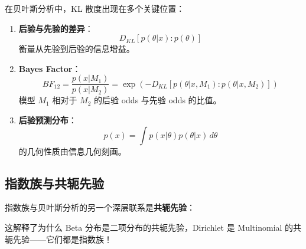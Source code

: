 在贝叶斯分析中，KL 散度出现在多个关键位置：

\begin{enumerate}
    \item \textbf{后验与先验的差异}：
    \begin{equation}
        D_{KL}[p(\theta|x) : p(\theta)]
    \end{equation}
    衡量从先验到后验的信息增益。

    \item \textbf{Bayes Factor}：
    \begin{equation}
        BF_{12} = \frac{p(x|M_1)}{p(x|M_2)} = \exp\left(-D_{KL}[p(\theta|x,M_1) : p(\theta|x,M_2)]\right)
    \end{equation}
    模型 $M_1$ 相对于 $M_2$ 的后验 odds 与先验 odds 的比值。

    \item \textbf{后验预测分布}：
    \begin{equation}
        p(x) = \int p(x|\theta) p(\theta|x) \, d\theta
    \end{equation}
    的几何性质由信息几何刻画。
\end{enumerate}


\subsection{指数族与共轭先验}\label{sec:exp-fam-conjugate}

指数族与贝叶斯分析的另一个深层联系是\textbf{共轭先验}：

\begin{Theorem}[指数族的共轭性]\label_thm:conjugate-prior}
    若似然函数来自指数族：
    \begin{equation}
        p(x|\theta) = \exp(\theta \cdot u(x) - \psi(\theta))
    \end{equation}
    则共轭先验具有形式：
    \begin{equation}
        p(\theta|\alpha, \beta) \propto \exp(\alpha \cdot \theta - \beta \psi(\theta))
    \end{equation}
    其中 $\alpha, \beta$ 是超参数。
\end{Theorem}

这解释了为什么 Beta 分布是二项分布的共轭先验，Dirichlet 是 Multinomial 的共轭先验——它们都是指数族！


